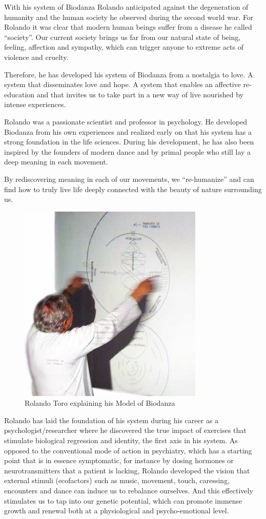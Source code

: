 \documentclass[
  11pt,
]{book}
\begin{document}
With his system of Biodanza Rolando anticipated against the degeneration of humanity and the human society he observed during the second world war. For Rolando it was clear that modern human beings suffer from a disease he called ``society''. Our current society brings us far from our natural state of being, feeling, affection and sympathy, which can trigger anyone to extreme acts of violence and cruelty.

Therefore, he has developed his system of Biodanza from a nostalgia to love. A system that disseminates love and hope. A system that enables an affective re-education and that invites us to take part in a new way of live nourished by intense experiences.

Rolando was a passionate scientist and professor in psychology. He developed Biodanza from his own experiences and realized early on that his system has a strong foundation in the life sciences. During his development, he has also been inspired by the founders of modern dance and by primal people who still lay a deep meaning in each movement.

By rediscovering meaning in each of our movements, we ``re-humanize'' and can find how to truly live life deeply connected with the beauty of nature surrounding us.

\begin{figure}

{\centering \includegraphics[width=0.45\linewidth]{./figs/rolandoAndModel} 

}

\caption{Rolando Toro explaining his Model of Biodanza}\label{fig:rolandoModel}
\end{figure}

Rolando has laid the foundation of his system during his career as a psychologist/researcher where he discovered the true impact of exercises that stimulate biological regression and identity, the first axis in his system. As opposed to the conventional mode of action in psychiatry, which has a starting point that is in essence symptomatic, for instance by dosing hormones or neurotransmitters that a patient is lacking, Rolando developed the vision that external stimuli (ecofactors) such as music, movement, touch, caressing, encounters and dance can induce us to rebalance ourselves. And this effectively stimulates us to tap into our genetic potential, which can promote immense growth and renewal both at a physiological and psycho-emotional level.
\end{document}
